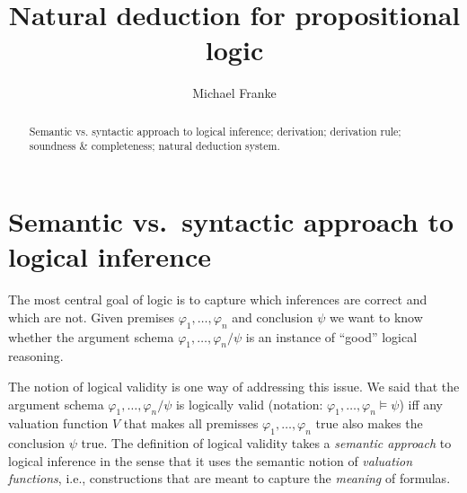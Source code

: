 \documentclass[nobib,nofonts]{tufte-handout}
\title{Natural deduction for propositional logic}
\author[M.~Franke]{Michael Franke}
\date{} %
\newcommand{\proplog}{\acro{PropLog}}
\begin{document}
\maketitle

\begin{abstract}
\noindent
Semantic vs. syntactic approach to logical inference; derivation; derivation rule; soundness \& completeness; natural deduction system.
\end{abstract}

\section{Semantic vs.~syntactic approach to logical inference}


The most central goal of logic is to capture which inferences are correct and which are not.
Given premises $\varphi_{1}, \dots, \varphi_{n}$ and conclusion $\psi$ we want to know whether the argument schema $\varphi_{1}, \dots, \varphi_{n} / \psi$ is an instance of ``good'' logical reasoning.

The notion of logical validity is one way of addressing this issue.
We said that the argument schema $\varphi_{1}, \dots, \varphi_{n} / \psi$ is logically valid (notation: $\varphi_{1}, \dots, \varphi_{n} \models \psi$) iff any valuation function $V$ that makes all premisses $\varphi_{1}, \dots, \varphi_{n}$ true also makes the conclusion $\psi$ true.
The definition of logical validity takes a \emph{semantic approach} to logical inference in the sense that it uses the semantic notion of \emph{valuation functions}, i.e., constructions that are meant to capture the \emph{meaning} of formulas.
\end{document}
